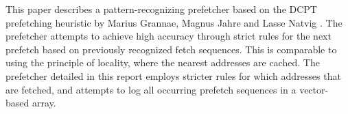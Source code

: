 This paper describes a pattern-recognizing prefetcher based on the DCPT prefetching heuristic by Marius Grannae, Magnus Jahre and Lasse Natvig \cite{reference:jahre}. The prefetcher attempts to achieve high accuracy through strict rules for the next prefetch based on previously recognized fetch sequences. This is comparable to using the principle of locality, where the nearest addresses are cached. The prefetcher detailed in this report employs stricter rules for which addresses that are fetched, and attempts to log all occurring prefetch sequences in a vector-based array.